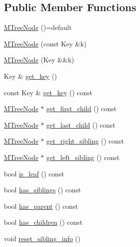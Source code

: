 \subsection*{Public Member Functions}
\begin{DoxyCompactItemize}
\item 
\hyperlink{class_designar_1_1_m_tree_node_a8312cbf8769f92de4348c69f9f7fce40}{M\+Tree\+Node} ()=default
\item 
\hyperlink{class_designar_1_1_m_tree_node_a823994c2cdeba2768bdb10163f27a6b1}{M\+Tree\+Node} (const Key \&k)
\item 
\hyperlink{class_designar_1_1_m_tree_node_abee75a0ea8366fe1f815afddc4b18163}{M\+Tree\+Node} (Key \&\&k)
\item 
Key \& \hyperlink{class_designar_1_1_m_tree_node_a6bccdf14efbc480aaa4d23c943b5a100}{get\+\_\+key} ()
\item 
const Key \& \hyperlink{class_designar_1_1_m_tree_node_aaf4dc39561e8db6973db9c1b5a88b466}{get\+\_\+key} () const
\item 
\hyperlink{class_designar_1_1_m_tree_node}{M\+Tree\+Node} $\ast$ \hyperlink{class_designar_1_1_m_tree_node_a4e9b81f97d9f471a44e4fb84b1bb224b}{get\+\_\+first\+\_\+child} () const
\item 
\hyperlink{class_designar_1_1_m_tree_node}{M\+Tree\+Node} $\ast$ \hyperlink{class_designar_1_1_m_tree_node_a6b2089185feed25ae434f46584b83ffc}{get\+\_\+last\+\_\+child} () const
\item 
\hyperlink{class_designar_1_1_m_tree_node}{M\+Tree\+Node} $\ast$ \hyperlink{class_designar_1_1_m_tree_node_a1da0c771ce14330be0e13716c242a0a3}{get\+\_\+right\+\_\+sibling} () const
\item 
\hyperlink{class_designar_1_1_m_tree_node}{M\+Tree\+Node} $\ast$ \hyperlink{class_designar_1_1_m_tree_node_a10ec8a3f078b1f3d63773ca16602719c}{get\+\_\+left\+\_\+sibling} () const
\item 
bool \hyperlink{class_designar_1_1_m_tree_node_a51d59eaaff91520cbf9b7d255a420a06}{is\+\_\+leaf} () const
\item 
bool \hyperlink{class_designar_1_1_m_tree_node_a2dfae442a5cffced27a7e1f106f3821f}{has\+\_\+siblings} () const
\item 
bool \hyperlink{class_designar_1_1_m_tree_node_a22503a2ccff5be2659b4af0df4822275}{has\+\_\+parent} () const
\item 
bool \hyperlink{class_designar_1_1_m_tree_node_ae3f1add8565b20f3957e512c9d64cea1}{has\+\_\+children} () const
\item 
void \hyperlink{class_designar_1_1_m_tree_node_a7bbcaf3f2dc77eaf4c593e64ca20c5f0}{reset\+\_\+sibling\+\_\+info} ()

\end{DoxyCompactItemize}
